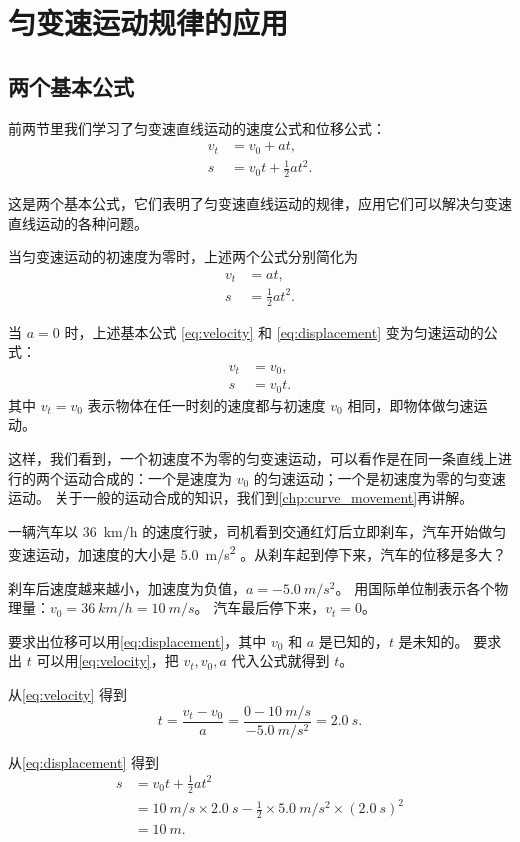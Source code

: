 \section{匀变速运动规律的应用}
\subsection{两个基本公式}
前两节里我们学习了匀变速直线运动的速度公式和位移公式：
\begin{align}
\label{eq:velocity} v_t&=v_0+at,\\
\label{eq:displacement} s&=v_0 t+\frac{1}{2}at^2.
\end{align}

这是两个基本公式，它们表明了匀变速直线运动的规律，应用它们可以解决匀变速直线运动的各种问题。

当匀变速运动的初速度为零时，上述两个公式分别简化为
\begin{align}
  \label{eq:velocity0} v_t&=at,\\
  \label{eq:displacement0} s&=\frac{1}{2}at^2.
\end{align}

当 $a=0$ 时，上述基本公式 \eqref{eq:velocity} 和 \eqref{eq:displacement} 变为匀速运动的公式：
\[\begin{split}
v_t&=v_0,\\
s&=v_0t.
\end{split}\]
其中 $v_t=v_0$ 表示物体在任一时刻的速度都与初速度 $v_0$ 相同，即物体做匀速运动。

这样，我们看到，一个初速度不为零的匀变速运动，可以看作是在同一条直线上进行的两个运动合成的：一个是速度为 $v_0$ 的匀速运动；一个是初速度为零的匀变速运动。
关于一般的运动合成的知识，我们到\cref{chp:curve_movement}再讲解。

\begin{example}\label{exp:car_brake}
一辆汽车以 \qty{36}{km/h} 的速度行驶，司机看到交通红灯后立即刹车，汽车开始做匀变速运动，加速度的大小是 \qty{5.0}{m/s^2} 。从刹车起到停下来，汽车的位移是多大？
\end{example}

\begin{solution}
刹车后速度越来越小，加速度为负值，$a= \qty{-5.0}{m/s^2} $。
用国际单位制表示各个物理量：$v_0=\qty{36}{km/h}=\qty{10}{m/s}$。
汽车最后停下来，$v_t=0$。

要求出位移可以用\cref{eq:displacement}，其中 $v_0$ 和 $a$ 是已知的，$t$ 是未知的。
要求出 $t$ 可以用\cref{eq:velocity}，把 $v_t,v_0,a$ 代入公式就得到 $t$。

从\cref{eq:velocity} 得到
\[t=\frac{v_t-v_0}{a}=\frac{0-\qty{10}{m/s}}{\qty{-5.0}{m/s^2} }=\qty{2.0}{s}.\]

从\cref{eq:displacement} 得到
\[\begin{split}
s&=v_0t+\frac{1}{2}at^2\\
&=\qty{10}{m/s} \times \qty{2.0}{s}-\frac{1}{2}\times\qty{5.0}{m/s^2}\times (\qty{2.0}{s})^2\\
&=\qty{10}{m}.
\end{split} \]
\end{solution}

